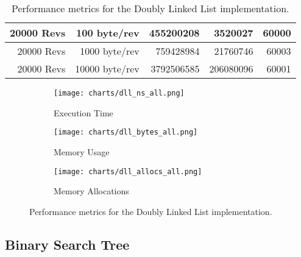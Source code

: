 \begin{table}[h]
\begin{tabular}{|r|r|r|r|r|}
        20000 Revs                                    & 100 byte/rev                             & 455200208                                 & 3520027                                      & 60000                                         \\ \hline
        20000 Revs                                    & 1000 byte/rev                            & 759428984                                 & 21760746                                     & 60003                                         \\ \hline
        20000 Revs                                    & 10000 byte/rev                           & 3792506585                                & 206080096                                    & 60001                                         \\ \hline
    \end{tabular}
    \caption{Performance metrics for the Doubly Linked List implementation.}
    \label{tab:doubly-linked-list-benchmark-results}
\end{table}

\begin{figure}[H]
    \centering
    \begin{subfigure}[b]{0.8\textwidth}
        \texttt{[image: charts/dll\_ns\_all.png]}
        \caption{Execution Time}
        \label{fig:doubly-linked-list-execution-time}
    \end{subfigure}

    \begin{subfigure}[b]{0.8\textwidth}
        \texttt{[image: charts/dll\_bytes\_all.png]}
        \caption{Memory Usage}
        \label{fig:doubly-linked-list-memory-usage}
    \end{subfigure}

    \begin{subfigure}[b]{0.8\textwidth}
        \texttt{[image: charts/dll\_allocs\_all.png]}
        \caption{Memory Allocations}
        \label{fig:doubly-linked-list-memory-allocations}
    \end{subfigure}

    \caption{Performance metrics for the Doubly Linked List implementation.}
    \label{fig:doubly-linked-list-performance-metrics}
\end{figure}

\subsection{Binary Search Tree}

